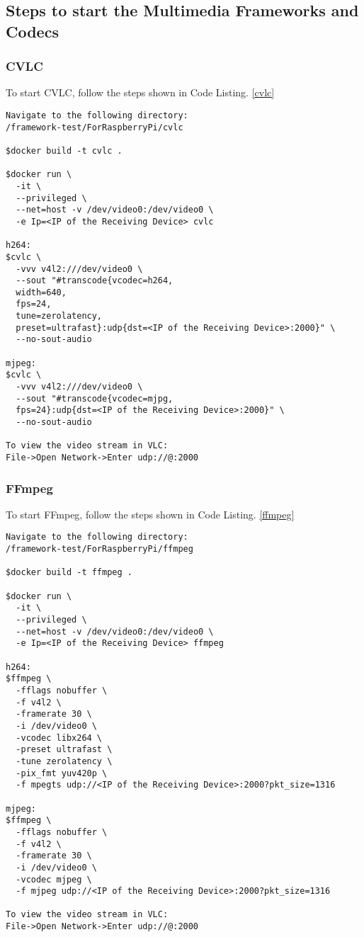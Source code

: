\label{sec:appendix}

\subsection*{Steps to start the Multimedia Frameworks and Codecs}

\subsubsection*{CVLC}
To start CVLC, follow the steps shown in Code Listing. \ref{cvlc}

\begin{lstlisting}[caption={Build and run CVLC}, frame=lines, label={cvlc}]
Navigate to the following directory:
/framework-test/ForRaspberryPi/cvlc

$docker build -t cvlc .

$docker run \
  -it \
  --privileged \
  --net=host -v /dev/video0:/dev/video0 \
  -e Ip=<IP of the Receiving Device> cvlc

h264:
$cvlc \
  -vvv v4l2:///dev/video0 \
  --sout "#transcode{vcodec=h264,
  width=640,
  fps=24,
  tune=zerolatency,
  preset=ultrafast}:udp{dst=<IP of the Receiving Device>:2000}" \
  --no-sout-audio

mjpeg:
$cvlc \
  -vvv v4l2:///dev/video0 \
  --sout "#transcode{vcodec=mjpg,
  fps=24}:udp{dst=<IP of the Receiving Device>:2000}" \
  --no-sout-audio

To view the video stream in VLC:
File->Open Network->Enter udp://@:2000
\end{lstlisting}

\subsubsection*{FFmpeg}
To start FFmpeg, follow the steps shown in Code Listing. \ref{ffmpeg}

\begin{lstlisting}[caption={Build and run Ffmpeg}, frame=lines, label={ffmpeg}]
Navigate to the following directory:
/framework-test/ForRaspberryPi/ffmpeg

$docker build -t ffmpeg .

$docker run \
  -it \
  --privileged \
  --net=host -v /dev/video0:/dev/video0 \
  -e Ip=<IP of the Receiving Device> ffmpeg
  
h264:
$ffmpeg \
  -fflags nobuffer \
  -f v4l2 \
  -framerate 30 \
  -i /dev/video0 \
  -vcodec libx264 \
  -preset ultrafast \
  -tune zerolatency \
  -pix_fmt yuv420p \
  -f mpegts udp://<IP of the Receiving Device>:2000?pkt_size=1316

mjpeg:
$ffmpeg \
  -fflags nobuffer \
  -f v4l2 \
  -framerate 30 \
  -i /dev/video0 \
  -vcodec mjpeg \
  -f mjpeg udp://<IP of the Receiving Device>:2000?pkt_size=1316

To view the video stream in VLC:
File->Open Network->Enter udp://@:2000
\end{lstlisting}

